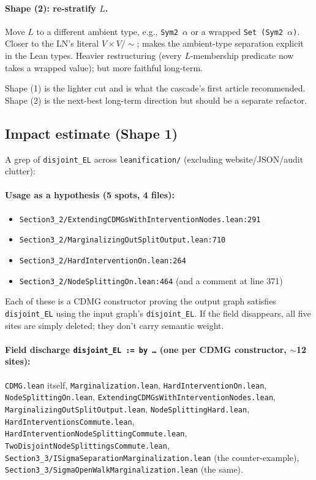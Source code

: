 \documentclass[11pt,a4paper]{article}
\begin{document}
\paragraph{Shape (2): re-stratify $L$.} Move $L$ to a different ambient
type, e.g., \texttt{Sym2 $\alpha$} or a wrapped \texttt{Set (Sym2 $\alpha$)}.
Closer to the LN's literal $V \times V / \sim$; makes the
ambient-type separation explicit in the Lean types. Heavier
restructuring (every $L$-membership predicate now takes a wrapped
value); but more faithful long-term.

Shape (1) is the lighter cut and is what the cascade's first article
recommended. Shape (2) is the next-best long-term direction but
should be a separate refactor.

\subsection{Impact estimate (Shape 1)}

A grep of \verb|disjoint_EL| across \texttt{leanification/}
(excluding website/JSON/audit clutter):

\paragraph{Usage as a hypothesis (5 spots, 4 files):}
\begin{itemize}
  \item \verb|Section3_2/ExtendingCDMGsWithInterventionNodes.lean:291|
  \item \verb|Section3_2/MarginalizingOutSplitOutput.lean:710|
  \item \verb|Section3_2/HardInterventionOn.lean:264|
  \item \verb|Section3_2/NodeSplittingOn.lean:464| (and a comment at line 371)
\end{itemize}
Each of these is a CDMG constructor proving the output graph satisfies
\verb|disjoint_EL| using the input graph's \verb|disjoint_EL|. If the
field disappears, all five sites are simply deleted; they don't carry
semantic weight.

\paragraph{Field discharge \texttt{disjoint\_EL := by \dots} (one per
CDMG constructor, $\sim$12 sites):}
\verb|CDMG.lean| itself, \verb|Marginalization.lean|,
\verb|HardInterventionOn.lean|, \verb|NodeSplittingOn.lean|,
\verb|ExtendingCDMGsWithInterventionNodes.lean|,
\verb|MarginalizingOutSplitOutput.lean|, \verb|NodeSplittingHard.lean|,
\verb|HardInterventionsCommute.lean|,
\verb|HardInterventionNodeSplittingCommute.lean|,
\verb|TwoDisjointNodeSplittingsCommute.lean|,
\verb|Section3_3/ISigmaSeparationMarginalization.lean| (the
counter-example), \verb|Section3_3/SigmaOpenWalkMarginalization.lean|
(the same).
\end{document}

